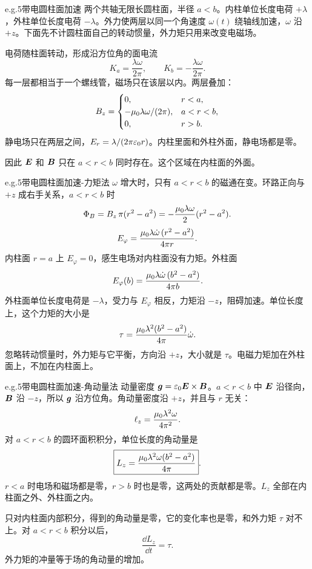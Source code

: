 \begin{frame}{e.g.5带电圆柱面加速}
两个共轴无限长圆柱面，半径 $a<b$。内柱单位长度电荷 $+\lambda$，外柱单位长度电荷 $-\lambda$。外力使两层以同一个角速度 $\omega(t)$ 绕轴线加速，$\omega$ 沿 $+z$。下面先不计圆柱面自己的转动惯量，外力矩只用来改变电磁场。

电荷随柱面转动，形成沿方位角的面电流
\[
 K_a=\frac{\lambda\omega}{2\pi},\qquad
 K_b=-\frac{\lambda\omega}{2\pi}.
\]
每一层都相当于一个螺线管，磁场只在该层以内。两层叠加：
\[
 B_z=
 \begin{cases}
 0,&r<a,\\
 -\mu_0\lambda\omega/(2\pi),&a<r<b,\\
 0,&r>b.
 \end{cases}
\]
静电场只在两层之间，$E_r=\lambda/(2\pi\varepsilon_0 r)$。内柱里面和外柱外面，静电场都是零。

因此 $\bm{E}$ 和 $\bm{B}$ 只在 $a<r<b$ 同时存在。这个区域在内柱面的外面。
\end{frame}

\begin{frame}{e.g.5带电圆柱面加速-力矩法}
$\omega$ 增大时，只有 $a<r<b$ 的磁通在变。环路正向与 $+z$ 成右手关系，$a<r<b$ 时
\[
 \Phi_B=B_z\,\pi(r^2-a^2)
 =-\frac{\mu_0\lambda\omega}{2}(r^2-a^2).
\]
\[
 E_\varphi=\frac{\mu_0\lambda\dot\omega\,(r^2-a^2)}{4\pi r}.
\]
内柱面 $r=a$ 上 $E_\varphi=0$，感生电场对内柱面没有力矩。外柱面
\[
 E_\varphi(b)=\frac{\mu_0\lambda\dot\omega\,(b^2-a^2)}{4\pi b}.
\]
外柱面单位长度电荷是 $-\lambda$，受力与 $E_\varphi$ 相反，力矩沿 $-z$，阻碍加速。单位长度上，这个力矩的大小是
\[
 \tau=\frac{\mu_0\lambda^2(b^2-a^2)}{4\pi}\dot\omega.
\]
忽略转动惯量时，外力矩与它平衡，方向沿 $+z$，大小就是 $\tau$。电磁力矩加在外柱面上，不加在内柱面上。
\end{frame}

\begin{frame}{e.g.5带电圆柱面加速-角动量法}
动量密度 $\bm{g}=\varepsilon_0\bm{E}\times\bm{B}$。$a<r<b$ 中 $\bm{E}$ 沿径向，$\bm{B}$ 沿 $-z$，所以 $\bm{g}$ 沿方位角。角动量密度沿 $+z$，并且与 $r$ 无关：
\[
 \ell_z=\frac{\mu_0\lambda^2\omega}{4\pi^2}.
\]
对 $a<r<b$ 的圆环面积积分，单位长度的角动量是
\[
 \boxed{L_z=\frac{\mu_0\lambda^2\omega(b^2-a^2)}{4\pi}}.
\]
$r<a$ 时电场和磁场都是零，$r>b$ 时也是零，这两处的贡献都是零。$L_z$ 全部在内柱面之外、外柱面之内。

只对内柱面内部积分，得到的角动量是零，它的变化率也是零，和外力矩 $\tau$ 对不上。对 $a<r<b$ 积分以后，
\[
 \frac{\dd L_z}{\dd t}=\tau.
\]
外力矩的冲量等于场的角动量的增加。
\end{frame}

